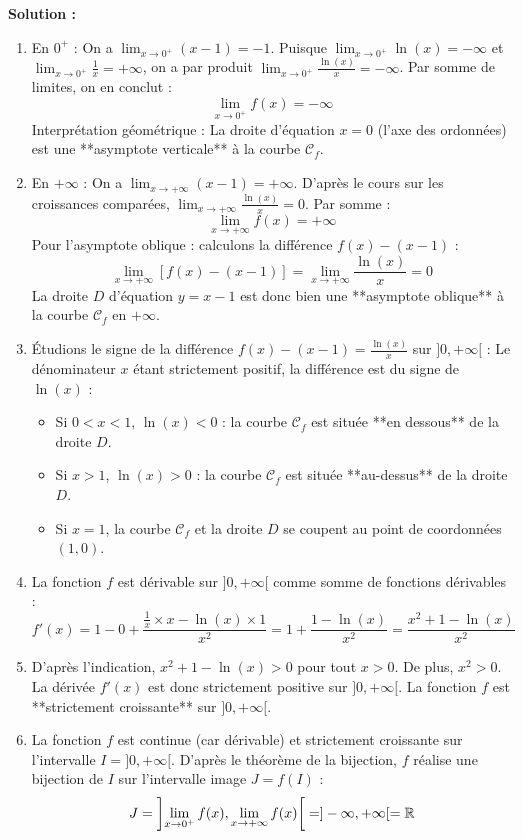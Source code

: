 \textbf{Solution :}
\begin{enumerate}
    \item En $0^+$ :
      On a $\lim_{x \to 0^+} (x-1) = -1$.
      Puisque $\lim_{x \to 0^+} \ln(x) = -\infty$ et $\lim_{x \to 0^+} \frac{1}{x} = +\infty$, on a par produit $\lim_{x \to 0^+} \frac{\ln(x)}{x} = -\infty$.
      Par somme de limites, on en conclut :
      \[
      \lim_{x \to 0^+} f(x) = -\infty
      \]
      Interprétation géométrique : La droite d'équation $x = 0$ (l'axe des ordonnées) est une **asymptote verticale** à la courbe $\mathcal{C}_f$.
      
    \item En $+\infty$ :
      On a $\lim_{x \to +\infty} (x-1) = +\infty$.
      D'après le cours sur les croissances comparées, $\lim_{x \to +\infty} \frac{\ln(x)}{x} = 0$.
      Par somme :
      \[
      \lim_{x \to +\infty} f(x) = +\infty
      \]
      Pour l'asymptote oblique : calculons la différence $f(x) - (x-1)$ :
      \[
      \lim_{x \to +\infty} [f(x) - (x-1)] = \lim_{x \to +\infty} \frac{\ln(x)}{x} = 0
      \]
      La droite $D$ d'équation $y = x-1$ est donc bien une **asymptote oblique** à la courbe $\mathcal{C}_f$ en $+\infty$.
      
    \item Étudions le signe de la différence $f(x) - (x-1) = \frac{\ln(x)}{x}$ sur $]0, +\infty[$ :
      Le dénominateur $x$ étant strictement positif, la différence est du signe de $\ln(x)$ :
      \begin{itemize}
          \item Si $0 < x < 1$, $\ln(x) < 0$ : la courbe $\mathcal{C}_f$ est située **en dessous** de la droite $D$.
          \item Si $x > 1$, $\ln(x) > 0$ : la courbe $\mathcal{C}_f$ est située **au-dessus** de la droite $D$.
          \item Si $x = 1$, la courbe $\mathcal{C}_f$ et la droite $D$ se coupent au point de coordonnées $(1, 0)$.
      \end{itemize}
      
    \item La fonction $f$ est dérivable sur $]0, +\infty[$ comme somme de fonctions dérivables :
      \[
      f'(x) = 1 - 0 + \frac{\frac{1}{x} \times x - \ln(x) \times 1}{x^2} = 1 + \frac{1 - \ln(x)}{x^2} = \frac{x^2 + 1 - \ln(x)}{x^2}
      \]
      
    \item D'après l'indication, $x^2 + 1 - \ln(x) > 0$ pour tout $x > 0$. De plus, $x^2 > 0$.
      La dérivée $f'(x)$ est donc strictement positive sur $]0, +\infty[$.
      La fonction $f$ est **strictement croissante** sur $]0, +\infty[$.
      
    \item La fonction $f$ est continue (car dérivable) et strictement croissante sur l'intervalle $I = ]0, +\infty[$.
      D'après le théorème de la bijection, $f$ réalise une bijection de $I$ sur l'intervalle image $J = f(I)$ :
      \[
      J = \left] \lim_{x \to 0^+} f(x), \lim_{x \to +\infty} f(x) \right[ = ]-\infty, +\infty[ = \mathbb{R}
      \]
\end{enumerate}

